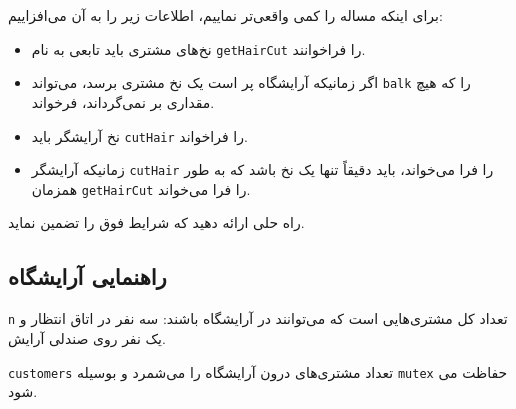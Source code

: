 \documentclass{book}
\newcommand{\clearemptydoublepage}{\newpage\cleardoublepage}
\begin{document}
    برای اینکه مساله را کمی واقعی‌تر نماییم، اطلاعات زیر را به آن می‌افزاییم: 

\begin{itemize}

\item %
    نخ‌های مشتری باید تابعی به نام {\tt getHairCut} را فراخوانند. 

\item 
    اگر زمانیکه آرایشگاه پر است یک نخ مشتری برسد، می‌تواند {\tt balk} را که هیچ مقداری بر نمی‌گرداند،  فرخواند. 

\item %
    نخ آرایشگر باید {\tt cutHair} را فراخواند. 

\item 
    زمانیکه آرایشگر {\tt cutHair} را فرا می‌خواند،‌ باید دقیقاً تنها یک نخ باشد که به طور همزمان  {\tt getHairCut} را فرا می‌خواند. 

\end{itemize}

    راه حلی ارائه دهید  که شرایط فوق را تضمین نماید. 


\clearemptydoublepage
\subsection{راهنمایی آرایشگاه}

%


    {\tt n}    تعداد کل مشتری‌هایی است که می‌توانند در آرایشگاه باشند: سه نفر در اتاق انتظار و یک نفر روی صندلی آرایش. 

    {\tt customers}        تعداد مشتری‌های درون آرایشگاه را می‌شمرد و بوسیله  {\tt mutex} حفاظت می‌ شود. 
    
\end{document}
